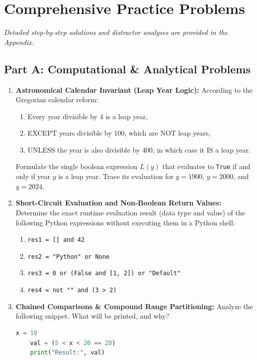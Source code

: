\newpage
\section{Comprehensive Practice Problems}
\textit{Detailed step-by-step solutions and distractor analyses are provided in the Appendix.}

\subsection*{Part A: Computational \& Analytical Problems}

\begin{enumerate}
    \item \textbf{Astronomical Calendar Invariant (Leap Year Logic):}
    According to the Gregorian calendar reform:
    \begin{enumerate}
        \item Every year divisible by 4 is a leap year,
        \item EXCEPT years divisible by 100, which are NOT leap years,
        \item UNLESS the year is also divisible by 400, in which case it IS a leap year.
    \end{enumerate}
    Formulate the single boolean expression $L(y)$ that evaluates to \texttt{True} if and only if year $y$ is a leap year. Trace its evaluation for $y = 1900$, $y = 2000$, and $y = 2024$.

    \item \textbf{Short-Circuit Evaluation and Non-Boolean Return Values:}
    Determine the exact runtime evaluation result (data type and value) of the following Python expressions without executing them in a Python shell:
    \begin{enumerate}
        \item \texttt{res1 = [] and 42}
        \item \texttt{res2 = "Python" or None}
        \item \texttt{res3 = 0 or (False and [1, 2]) or "Default"}
        \item \texttt{res4 = not "" and (3 > 2)}
    \end{enumerate}

    \item \textbf{Chained Comparisons \& Compound Range Partitioning:}
    Analyze the following snippet. What will be printed, and why?
    \begin{lstlisting}[language=Python]
    x = 10
    val = (5 < x < 20 == 20)
    print("Result:", val)
    \end{lstlisting}


\end{enumerate}
